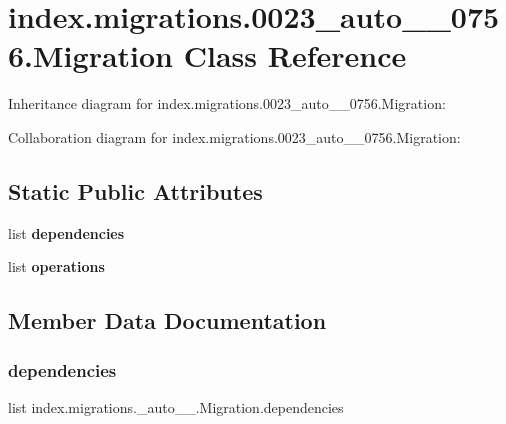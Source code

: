 \hypertarget{classindex_1_1migrations_1_10023__auto__20171026__0756_1_1Migration}{}\section{index.\+migrations.0023\+\_\+auto\+\_\+\_\+0756.Migration Class Reference}
\label{classindex_1_1migrations_1_10023__auto__20171026__0756_1_1Migration}


Inheritance diagram for index.\+migrations.0023\+\_\+auto\+\_\+\_\+0756.Migration\+:


Collaboration diagram for index.\+migrations.0023\+\_\+auto\+\_\+\_\+0756.Migration\+:
\subsection*{Static Public Attributes}
\begin{DoxyCompactItemize}
\item 
list {\bfseries dependencies}
\item 
list {\bfseries operations}
\end{DoxyCompactItemize}


\subsection{Member Data Documentation}
\mbox{\label{classindex_1_1migrations_1_10023__auto__20171026__0756_1_1Migration_ade8c5019f89499e838085b5000ac6320}} 
\subsubsection{\texorpdfstring{dependencies}{dependencies}}
{\footnotesize\ttfamily list index.\+migrations.\+\_\+auto\+\_\+\_.\+Migration.\+dependencies\hspace{0.3cm}{\ttfamily [static]}}

